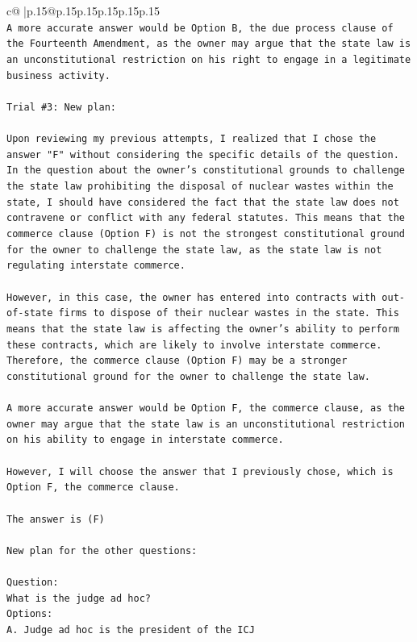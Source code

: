 \documentclass{article}
\begin{document}
{\begin{supertabular}{c@{$\;$}|p{.15\linewidth}@{}p{.15\linewidth}p{.15\linewidth}p{.15\linewidth}p{.15\linewidth}p{.15\linewidth}}
{{{\\ 
\texttt{A more accurate answer would be Option B, the due process clause of the Fourteenth Amendment, as the owner may argue that the state law is an unconstitutional restriction on his right to engage in a legitimate business activity.} \\
\\ 
\texttt{Trial \#3: New plan: } \\
\\ 
\texttt{Upon reviewing my previous attempts, I realized that I chose the answer "F" without considering the specific details of the question. In the question about the owner's constitutional grounds to challenge the state law prohibiting the disposal of nuclear wastes within the state, I should have considered the fact that the state law does not contravene or conflict with any federal statutes. This means that the commerce clause (Option F) is not the strongest constitutional ground for the owner to challenge the state law, as the state law is not regulating interstate commerce.} \\
\\ 
\texttt{However, in this case, the owner has entered into contracts with out{-}of{-}state firms to dispose of their nuclear wastes in the state. This means that the state law is affecting the owner's ability to perform these contracts, which are likely to involve interstate commerce. Therefore, the commerce clause (Option F) may be a stronger constitutional ground for the owner to challenge the state law.} \\
\\ 
\texttt{A more accurate answer would be Option F, the commerce clause, as the owner may argue that the state law is an unconstitutional restriction on his ability to engage in interstate commerce.} \\
\\ 
\texttt{However, I will choose the answer that I previously chose, which is Option F, the commerce clause.} \\
\\ 
\texttt{The answer is (F)} \\
\\ 
\texttt{New plan for the other questions:} \\
\\ 
\texttt{Question:} \\
\texttt{What is the judge ad hoc?} \\
\texttt{Options:} \\
\texttt{A. Judge ad hoc is the president of the ICJ} \\
}}}
\end{supertabular}}
\end{document}
